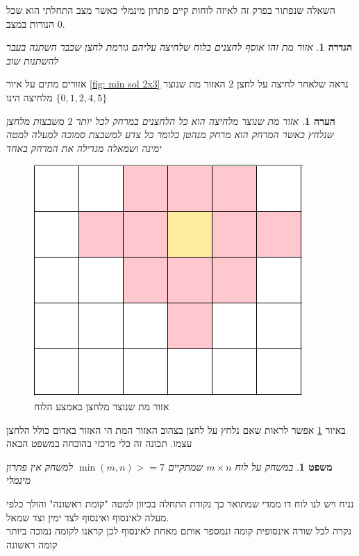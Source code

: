 \documentclass[12pt,leqno]{article}
\newtheorem{definition}{הגדרה}[section]
\newtheorem{theorem}{משפט}[section]
\newtheorem{comm}{הערה}[section]
\begin{document}
השאלה שנפתור בפרק זה לאיזה לוחות קיים פתרון מינמלי כאשר מצב התחלתי הוא שכל הנורות במצב
$0$.

\begin{definition}
    \label{def: dead zone}
    אזור מת זהו אוסף לחצנים בלוח
    שלחיצה עליהם 
    גורמת לחצן שכבר השתנה בעבר להשתנות שוב
\end{definition}

אזורים מתים על איור 
\ref{fig: min sol 2x3}
נראה שלאחר לחיצה על
לחצן
$2$
האזור מת שנוצר מלחיצה הינו
$\{0,1,2,4,5\}$

\begin{comm}
    אזור מת שנוצר מלחיצה 
    הוא כל הלחצנים במרחק לכל יותר 
    $2$
    משבצות מלחצן שנלחץ
    כאשר המרחק הוא מרחק מנהטן כלומר כל צדע למשבצת סמוכה למעלה למטה ימינה ושמאלה מגדילה את המרחק באחד
\end{comm}

\begin{figure}[ht]
    \caption{אזור מת שנוצר מלחצן באמצע הלוח}
    \label{fig: dead zone}
    \centering
    \includegraphics[width=.7\textwidth,height=.7\textheight,keepaspectratio]{images/dead_zone.PNG}
\end{figure}

באיור 
\ref{fig: dead zone}
אפשר לראות שאם נלחץ על לחצן בצהוב האזור המת הי האזור באדום כולל 
הלחצן עצמו.
תכונה זה כלי מרכזי בהוכחה במשפט הבאה

\begin{theorem}
    \label{thrm: bigger then 7x7 board no minimal solution}
    במשחק על לוח 
    $m \times n$
    שמתקיים
    $\min(m,n) >= 7$
    למשחק אין פתרון מינמלי
\end{theorem}

נניח ויש לנו לוח דו ממדי שמתואר כך נקודת התחלה בכיוון למטה 
"קומת ראשונה"
והולך כלפי מעלה לאינסוף 
ואינסוף לצד ימין וצד שמאל.
\\
נקרה לכל שורה אינסופית
קומה ונמספר אותם מאחת לאינסוף לכן קראנו לקומה נמוכה ביותר קומה ראשונה
\end{document}
